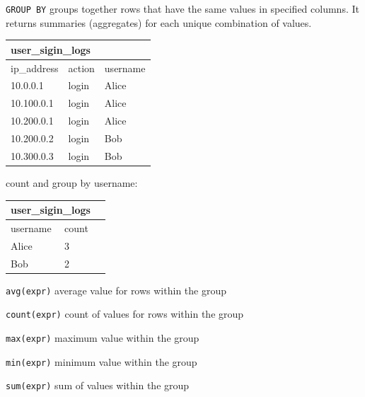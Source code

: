 \documentclass[9pt]{innovativeinnovation-cheatsheet}
\begin{document}
\begin{multicols}{3}
\newline
{}
\texttt{GROUP BY} groups together rows that have the same values in specified columns. It returns summaries (aggregates) for each unique combination of values. 

\begin{tabular}{| m{4em} | m{4em} | m{4em} }
      \hline
      \multicolumn{3}{|l|}{user\_sigin\_logs}\\
      \hline
      \hline
      ip\_address & action & username \\
      \hline
      10.0.0.1 & login & \cellcolor{blue!25} Alice \\
      \hline
      10.100.0.1 & login & \cellcolor{blue!25} Alice \\
      \hline
      10.200.0.1 & login & \cellcolor{blue!25} Alice \\
      \hline
      10.200.0.2 & login & \cellcolor{orange!25} Bob \\
      \hline
      10.300.0.3 & login & \cellcolor{orange!25} Bob \\
      \hline
\end{tabular}

count and group by username:

\begin{tabular}{| m{4em} | m{4em} | m{4em} }
      \hline
      \multicolumn{2}{|l|}{user\_sigin\_logs}\\
      \hline
      \hline
      username & count \\
      \hline
      \cellcolor{blue!25} Alice & 3 \\
      \hline
      \cellcolor{orange!25} Bob & 2 \\
      \hline
\end{tabular}

\vspace{-18pt}
\bi{}
\item \texttt{avg(expr)} average value for rows within the group
\item \texttt{count(expr)} count of values for rows within the group
\item \texttt{max(expr)} maximum value within the group
\item \texttt{min(expr)} minimum value within the group
\item \texttt{sum(expr)} sum of values within the group
\ei{}


\end{multicols}
\end{document}
